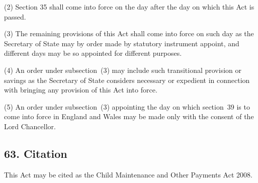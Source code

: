 \documentclass[12pt,a4paper]{article}
\begin{document}
(2) Section 35 shall come into force on the day after the day on which this Act is passed.

(3) The remaining provisions of this Act shall come into force on such day as the Secretary of State may by order made by statutory instrument appoint, and different days may be so appointed for different purposes.

(4) An order under subsection~(3) may include such transitional provision or savings as the Secretary of State considers necessary or expedient in connection with bringing any provision of this Act into force.

(5) An order under subsection~(3) appointing the day on which section~39 is to come into force in England and Wales may be made only with the consent of the Lord Chancellor.

\subsection{63. Citation}

This Act may be cited as the Child Maintenance and Other Payments Act 2008.

\small

\end{document}
